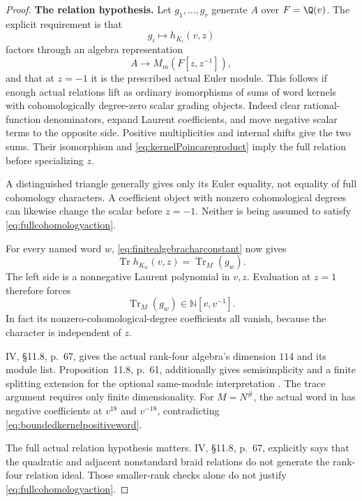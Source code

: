 \begin{proof}
\par\smallskip\noindent\textbf{The relation hypothesis.}\quad
Let \(g_1,\ldots,g_r\) generate \(A\) over \(F=\Q(v)\).
The explicit requirement is that
\[
g_i\longmapsto h_{K_i}(v,z)
\]
factors through an algebra representation
\begin{equation}\label{eq:fullcohomologyaction}
A\longrightarrow M_m(F[z,z^{-1}]),
\end{equation}
and that at \(z=-1\) it is the prescribed actual Euler module.
This follows if enough actual relations lift as ordinary
isomorphisms of sums of word kernels with cohomologically
degree-zero scalar grading objects.
Indeed clear rational-function denominators, expand Laurent
coefficients, and move negative scalar terms to the opposite
side. Positive multiplicities and internal shifts give the
two sums. Their isomorphism and
\eqref{eq:kernelPoincareproduct} imply the full relation before
specializing \(z\).

A distinguished triangle generally gives only its Euler
equality, not equality of full cohomology characters.
A coefficient object with nonzero cohomological degrees
can likewise change the scalar before \(z=-1\).
Neither is being assumed to satisfy
\eqref{eq:fullcohomologyaction}.

For every named word \(w\),
\eqref{eq:finitealgebracharconstant} now gives
\[
\operatorname{Tr}h_{K_w}(v,z)
=\operatorname{Tr}_{M}(g_w).
\]
The left side is a nonnegative Laurent polynomial in \(v,z\).
Evaluation at \(z=1\) therefore forces
\begin{equation}\label{eq:boundedkernelpositiveword}
\operatorname{Tr}_{M}(g_w)\in\mathbb N[v,v^{-1}].
\end{equation}
In fact its nonzero-cohomological-degree coefficients all vanish,
because the character is independent of \(z\).

IV, \S11.8, p.~67, gives the actual rank-four algebra's
dimension \(114\) and its module list.
Proposition~11.8, p.~61, additionally gives semisimplicity and
a finite splitting extension for the optional same-module
interpretation \cite{IV}.
The trace argument requires only finite dimensionality.
For \(M=N^\#\), the actual word in  has negative
coefficients at \(v^{18}\) and \(v^{-18}\), contradicting
\eqref{eq:boundedkernelpositiveword}.

The full actual relation hypothesis matters.
IV, \S11.8, p.~67, explicitly says that the quadratic and
adjacent nonstandard braid relations do not generate the
rank-four relation ideal. Those smaller-rank checks alone
do not justify \eqref{eq:fullcohomologyaction}.


\end{proof}
